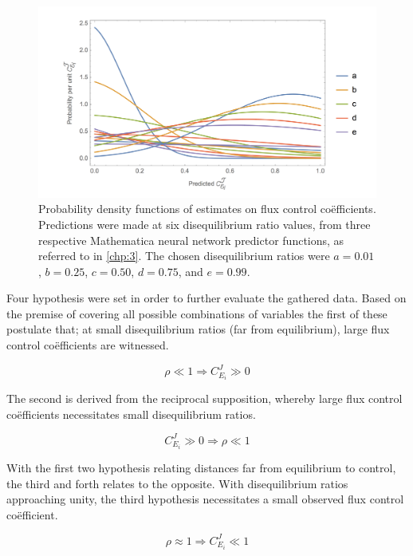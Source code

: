 \begin{figure}[p]
\includegraphics[width=1\textwidth]{figs/PredConf.png}
\centering
\caption{Probability density functions of estimates on flux control co\"efficients. Predictions were made at six disequilibrium ratio values, from three respective Mathematica neural network predictor functions, as referred to in \ref{chp:3}. The chosen disequilibrium ratios were $a = 0.01$, $b = 0.25$, $c = 0.50$, $d = 0.75$, and $e = 0.99$.}
\label{PredictionConfidence}
\end{figure}

Four hypothesis were set in order to further evaluate the gathered data. Based on the premise of covering all possible combinations of variables the first of these postulate that; at small disequilibrium ratios (far from equilibrium), large flux control co\"efficients are witnessed.

\begin{equation}\label{hyp1}
    \rho \ll 1 \Longrightarrow C_{E_i}^J \gg 0
\end{equation}

The second is derived from the reciprocal supposition, whereby large flux control co\"efficients necessitates small disequilibrium ratios.

\begin{equation}\label{hyp2}
    C_{E_i}^J \gg 0 \Longrightarrow \rho \ll 1
\end{equation}

With the first two hypothesis relating distances far from equilibrium to control, the third and forth relates to the opposite. With disequilibrium ratios approaching unity, the third hypothesis necessitates a small observed flux control co\"efficient.

\begin{equation}\label{hyp3}
    \rho \approx 1 \Longrightarrow C_{E_i}^J \ll 1
\end{equation}


